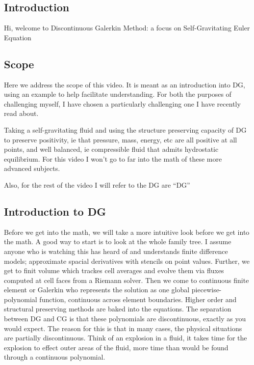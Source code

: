 \subsection{Introduction}

Hi, welcome to Discontinuous Galerkin Method: a focus on Self-Gravitating Euler Equation


\subsection{Scope}

Here we address the scope of this video. It is meant as an introduction into DG, using an example to help facilitate understanding. For both the purposes of challenging myself, I have chosen a particularly challenging one I have recently read about.

Taking a self-gravitating fluid and using the structure preserving capacity of DG to preserve positivity, ie that pressure, mass, energy, etc are all positive at all points, and well balanced, ie compressible fluid that admits hydrostatic equilibrium. For this video I won't go to far into the math of these more advanced subjects.

Also, for the rest of the video I will refer to the DG are ``DG''

\subsection{Introduction to DG}

Before we get into the math, we will take a more intuitive look before we get into the math. A good way to start is to look at the whole family tree. I assume anyone who is watching this has heard of and understands finite difference models; approximate spacial derivatives with stencils on point values. Further, we get to finit volume which trackes cell averages and evolve them via fluxes computed at cell faces from a Riemann solver. Then we come to continuous finite element or Galerkin who represents the solution as one global piecewise-polynomial function, continuous across element boundaries. Higher order and structural preserving methods are baked into the equations. The separation between DG and CG is that these polynomials are discontinuous, exactly as you would expect. The reason for this is that in many cases, the physical situations are partially discontinuous. Think of an explosion in a fluid, it takes time for the explosion to effect outer areas of the fluid, more time than would be found through a continuous polynomial.


